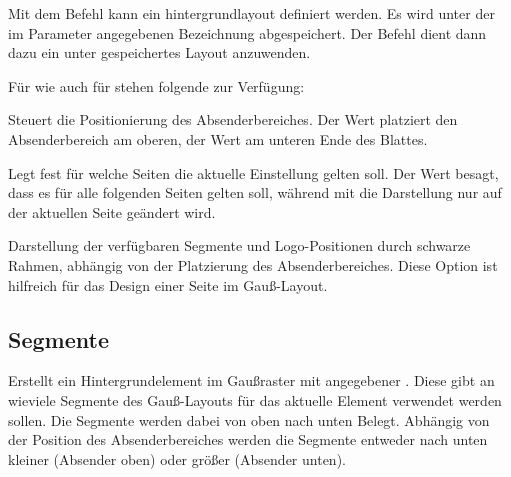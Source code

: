 Mit dem Befehl  kann ein hintergrundlayout definiert werden.
Es wird unter der im Parameter  angegebenen Bezeichnung
abgespeichert.
Der Befehl  dient dann dazu ein unter  gespeichertes
Layout anzuwenden.


Für  wie auch für  stehen folgende
 zur Verfügung:

\begin{Declaration}
\end{Declaration}

Steuert die Positionierung des Absenderbereiches.
Der Wert  platziert den Absenderbereich am oberen,
der Wert  am unteren Ende des Blattes.

\begin{Declaration}
\end{Declaration}

Legt fest für welche Seiten die aktuelle Einstellung gelten soll.
Der Wert  besagt, dass es für alle folgenden Seiten gelten soll,
während mit  die Darstellung nur auf der aktuellen Seite geändert 
wird.

\begin{Declaration}
\end{Declaration}

Darstellung der verfügbaren Segmente und Logo-Positionen durch schwarze Rahmen, abhängig von der Platzierung des Absenderbereiches.
Diese Option ist hilfreich für das Design einer Seite im Gauß-Layout.


\subsection{Segmente}\label{subsec:gausspage:bgsegment}

\begin{Declaration}
\end{Declaration}

Erstellt ein Hintergrundelement im Gaußraster mit angegebener .
Diese gibt an wieviele Segmente des Gauß-Layouts für das aktuelle Element
verwendet werden sollen.
Die Segmente werden dabei von oben nach unten Belegt.
Abhängig von der Position des Absenderbereiches werden die Segmente
entweder nach unten kleiner (Absender oben) oder größer (Absender unten).

